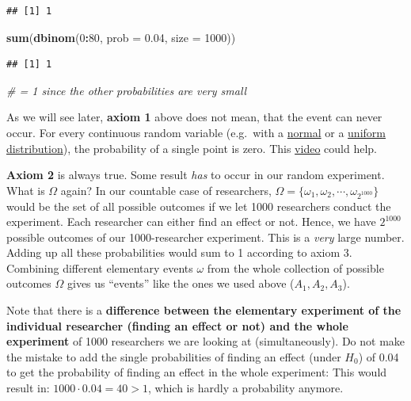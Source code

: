 \documentclass[
]{book}
\newenvironment{Shaded}{\begin{snugshade}}{\end{snugshade}}
\newcommand{\AttributeTok}[1]{\textcolor[rgb]{0.13,0.29,0.53}{#1}}
\newcommand{\CommentTok}[1]{\textcolor[rgb]{0.56,0.35,0.01}{\textit{#1}}}
\newcommand{\DecValTok}[1]{\textcolor[rgb]{0.00,0.00,0.81}{#1}}
\newcommand{\FloatTok}[1]{\textcolor[rgb]{0.00,0.00,0.81}{#1}}
\newcommand{\FunctionTok}[1]{\textcolor[rgb]{0.13,0.29,0.53}{\textbf{#1}}}
\newcommand{\NormalTok}[1]{#1}
\newcommand{\SpecialCharTok}[1]{\textcolor[rgb]{0.81,0.36,0.00}{\textbf{#1}}}
\begin{document}
\begin{verbatim}
## [1] 1
\end{verbatim}

\begin{Shaded}
\begin{Highlighting}[]
\FunctionTok{sum}\NormalTok{(}\FunctionTok{dbinom}\NormalTok{(}\DecValTok{0}\SpecialCharTok{:}\DecValTok{80}\NormalTok{, }\AttributeTok{prob =} \FloatTok{0.04}\NormalTok{, }\AttributeTok{size =} \DecValTok{1000}\NormalTok{))}
\end{Highlighting}
\end{Shaded}

\begin{verbatim}
## [1] 1
\end{verbatim}

\begin{Shaded}
\begin{Highlighting}[]
\CommentTok{\# = 1 since the other probabilities are very small}
\end{Highlighting}
\end{Shaded}

As we will see later, \textbf{axiom 1} above does not mean, that the event can never occur.
For every continuous random variable (e.g.~with a \href{https://en.wikipedia.org/wiki/Normal_distribution}{normal}
or a \href{https://en.wikipedia.org/wiki/Continuous_uniform_distribution}{uniform distribution}), the probability of a single point is zero.
This \href{https://www.youtube.com/watch?v=ZA4JkHKZM50&list=PLIhj5_pQwhMQfGZNQZREjDdJRt0t0sn51&index=10&ab_channel=3Blue1Brown}{video} could help.

\textbf{Axiom 2} is always true. Some result \emph{has} to occur in our random experiment.
What is \(\Omega\) again? In our countable case of researchers, \(\Omega = \{ \omega_1, \omega_2, \cdots, \omega_{2^{1000}} \}\) would be the set of all possible outcomes if we let 1000 researchers conduct the experiment.
Each researcher can either find an effect or not. Hence, we have \(2^{1000}\) possible outcomes of our 1000-researcher experiment. This is a \emph{very} large number. Adding up all
these probabilities would sum to 1 according to axiom 3. Combining different elementary events \(\omega\) from the whole collection of possible outcomes \(\Omega\)
gives us ``events'' like the ones we used above (\(A_1, A_2, A_3\)).

Note that there is a \textbf{difference between the elementary experiment of the individual researcher (finding an effect or not) and the whole experiment} of
1000 researchers we are looking at (simultaneously).
Do not make the mistake to add the single probabilities of finding an effect (under \(H_0\)) of 0.04 to get the probability of finding an effect in the whole experiment:
This would result in: \(1000 \cdot 0.04 = 40 > 1\), which is hardly a probability anymore.
\end{document}
